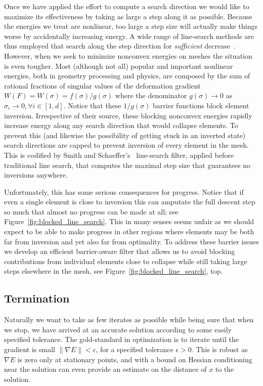 Once we have applied the effort to compute a search direction we would like to maximize its effectiveness by taking as large a step along it as possible. Because the energies we treat are nonlinear, too large a step size will actually make things worse by accidentally increasing energy. A wide range of line-search methods are thus employed that search along the step direction for \emph{sufficient} decrease~\cite{Nocedal:2006:Book}. However, when we seek to minimize nonconvex energies on meshes the situation is even tougher. Most (although not all) popular and important nonlinear energies, both in geometry processing and physics, are composed by the sum of rational fractions of singular values of the deformation gradient $W(F) = W(\sigma) = f(\sigma)/g(\sigma)$ where the denominator $g(\sigma) \rightarrow 0$ as $\sigma_i  \rightarrow 0, \forall i \in [1,d]$. Notice that these $1/g(\sigma)$ barrier functions block element inversion. 
Irrespective of their source, these blocking nonconvex energies rapidly increase energy along any search direction that would collapse elements. To prevent this (and likewise the possibility of getting stuck in an inverted state) search directions are capped to prevent inversion of every element in the mesh. This is codified by Smith and Schaeffer's~ line-search filter, applied before traditional line search, that computes the maximal step size that guarantees no inversions anywhere. 

Unfortunately, this has some serious consequences for progress. Notice that if even a single element is close to inversion this can amputate the full descent step so much that almost no progress can be made at all; see Figure~\ref{fig:blocked_line_search}. This in many senses seems unfair as we should expect to be able to make progress in other regions where elements may be both far from inversion and yet also far from optimality. 
To address these barrier issues we develop an efficient barrier-aware filter that allows us to avoid blocking contributions from individual elements close to collapse while still taking large steps elsewhere in the mesh, see Figure~\ref{fig:blocked_line_search}, top.

\subsection{Termination}
\label{sec:termination_woes}

Naturally we want to take as few iterates as possible while being sure
that when we stop, we have arrived at an accurate solution according to
some easily specified tolerance. The gold-standard in optimization
is to iterate until the gradient is small $\| \nabla E \| < \epsilon$, for
a specified tolerance $\epsilon>0$. This is robust as $\nabla E$ is zero only at stationary
points, and with a bound on Hessian conditioning near the solution can even provide
an estimate on the distance of $x$ to the solution.

